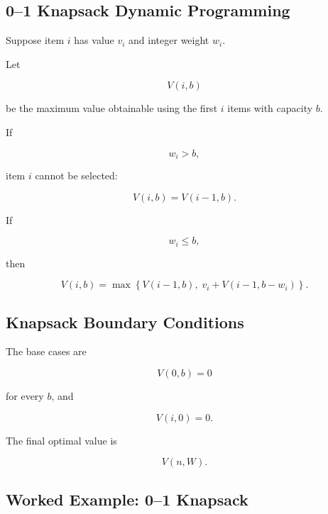 \subsection{0--1 Knapsack Dynamic Programming}
\label{subsec:knapsack-dynamic-programming}

Suppose item \(i\) has value \(v_i\) and integer weight \(w_i\).

Let

\[
V(i,b)
\]

be the maximum value obtainable using the first \(i\) items with capacity
\(b\).

If

\[
w_i>b,
\]

item \(i\) cannot be selected:

\[
\boxed{
V(i,b)
=
V(i-1,b).
}
\]

If

\[
w_i\leq b,
\]

then

\[
\boxed{
V(i,b)
=
\max
\left\{
V(i-1,b),
\;
v_i
+
V(i-1,b-w_i)
\right\}.
}
\]

\subsection{Knapsack Boundary Conditions}
\label{subsec:knapsack-boundary-conditions}

The base cases are

\[
\boxed{
V(0,b)=0
}
\]

for every \(b\), and

\[
\boxed{
V(i,0)=0.
}
\]

The final optimal value is

\[
\boxed{
V(n,W).
}
\]

\subsection{Worked Example: 0--1 Knapsack}
\label{subsec:worked-knapsack-dp}

